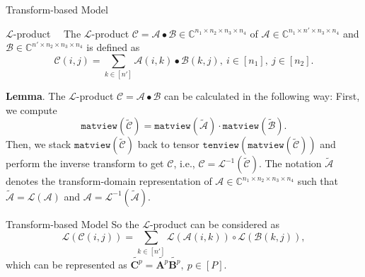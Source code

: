 \documentclass[t, 10pt, handout, aspectratio=169]{beamer}
\begin{document}
\begin{frame}{Transform-based Model}
\begin{block}{$\mathcal{L}$-product}
~~The $\mathcal{L}$-product $\mathcal{C}=\mathcal{A}\bullet\mathcal{B}\in\mathbb{C}^{n_1\times n_2\times n_3\times n_4}$ of $\mathcal{A}\in \mathbb{C}^{n_1\times n'\times n_3\times n_4}$ and $\mathcal{B}\in\mathbb{C}^{n'\times n_2\times n_3\times n_4}$ is defined as
$$
\mathcal{C}(i,j)=\sum_{k\in[n']}\mathcal{A}(i,k)\bullet\mathcal{B}(k,j), ~i\in[n_1], ~j\in[n_2].
$$
\end{block}
\textbf{Lemma}. The $\mathcal{L}$-product $\mathcal{C}=\mathcal{A}\bullet\mathcal{B}$ can be calculated in the following way: First, we compute
$$
\texttt{matview}(\widetilde{\mathcal{C}})=\texttt{matview}(\widetilde{\mathcal{A}})\cdot\texttt{matview}(\widetilde{\mathcal{B}}).
$$
Then, we stack $\texttt{matview}(\widetilde{\mathcal{C}})$ back to tensor $\texttt{tenview}(\texttt{matview}(\widetilde{\mathcal{C}}))$ and perform the inverse transform to get $\mathcal{C}$, i.e., $\mathcal{C}=\mathcal{L}^{-1}(\widetilde{\mathcal{C}})$. The notation $\widetilde{\mathcal{A}}$ denotes the transform-domain representation of $\mathcal{A}\in\mathbb{C}^{n_1\times n_2\times n_3\times n_4}$ such that $\widetilde{\mathcal{A}}=\mathcal{L}(\mathcal{A})$ and $\mathcal{A}=\mathcal{L}^{-1}(\widetilde{\mathcal{A}})$.

\end{frame}

\begin{frame}{Transform-based Model}
So the $\mathcal{L}$-product can be considered as
$$
\mathcal{L}(\mathcal{C}(i,j))=\sum_{k\in[n']}\mathcal{L}(\mathcal{A}(i,k))\circ\mathcal{L}(\mathcal{B}(k,j)),
$$
which can be represented as $\widetilde{\mathbf{C}^p}=\widetilde{\mathbf{A}^p}\widetilde{\mathbf{B}^p}, ~p\in[P]$.
\end{frame}
\end{document}
